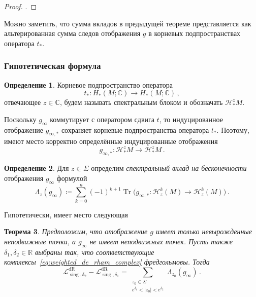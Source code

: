 \documentclass[a4paper, 12pt]{article}
\newtheorem{theorem}{Теорема}[section]
\theoremstyle{definition}
\newtheorem{definition}[theorem]{Определение}
\begin{document}
\begin{proof}
    \cite[Theorem 1.2]{mrowka2015index}.
\end{proof}

Можно заметить, что сумма вкладов в предыдущей теореме представляется как альтерированная сумма следов отображения \({ g }\) в корневых подпространствах оператора \({ t_{*} }\).

\subsubsection{Гипотетическая формула}

\begin{definition}
    Корневое подпространство оператора \[
        t_* : H_{*}(M; \mathbb C) \to H_{*}(M; \mathbb C)\,,
    \] отвечающее \({ z \in \mathbb C }\), будем называть спектральным блоком и обозначать \({ \mathcal H_{*}^{z}M }\).
\end{definition}

Поскольку \({ g_{\infty} }\) коммутирует с оператором сдвига \({ t }\), то индуцированное отображение \({ g_{\infty, *} }\) сохраняет корневые подпространства оператора \({ t_{*} }\). Поэтому, имеют место корректно определённые индуцированные отображения \[
    g_{\infty, *} : \mathcal H_{*}^{z}M \to \mathcal H_{*}^{z}M\,.
\]

\begin{definition}
    \label{def:spectral_lefschetz_contribution}
    Для $z \in \Sigma$ определим \emph{спектральный вклад на бесконечности} отображения \({ g_{\infty} }\) формулой
    \[
        \Lambda_z(g_{\infty}) \coloneqq \sum_{k=0}^{n} (-1)^{k+1} \operatorname{Tr}\bigl( g_{\infty,*} \colon \mathcal H^k_z(M) \to \mathcal H^k_z(M) \bigr)\,.
    \]
\end{definition}

Гипотетически, имеет место следующая

\begin{theorem}
    \label{thm:periodic_de_rham_formula}
    Предположим, что отображение $g$ имеет только невырожденные неподвижные точки, а \({ g_{\infty} }\) не имеет неподвижных точек. Пусть также $\delta_1, \delta_2 \in \mathbb R$ выбраны так, что соответствующие комплексы~\eqref{eq:weighted_de_rham_complex} фредгольмовы. Тогда
    \begin{equation}
        \label{eq:weighted_periodic_lefschetz_jump_formula}
        \mathcal L^{\operatorname{dR}}_{\operatorname{sing},\delta_2} - \mathcal L^{\operatorname{dR}}_{\operatorname{sing},\delta_1}
        =
        \sum_{\substack{z_0 \in \Sigma \\ e^{\delta_1} < |z_0| < e^{\delta_2}}}
        \Lambda_{z_0}(g_{\infty})\,.
    \end{equation}
\end{theorem}
\end{document}

